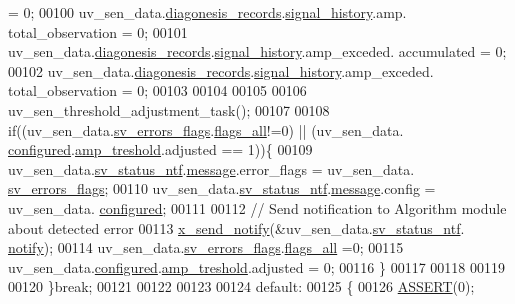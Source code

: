 \begin{DoxyCode}
                       = 0;
00100               uv\_sen\_data.\hyperlink{a00035_a7ae905b560513ad201e58c2f63375030}{diagonesis\_records}.\hyperlink{a00017_affb63906d23cb1cb7787d61eaaedfb60}{signal\_history}.amp.
      total\_observation           = 0;
00101               uv\_sen\_data.\hyperlink{a00035_a7ae905b560513ad201e58c2f63375030}{diagonesis\_records}.\hyperlink{a00017_affb63906d23cb1cb7787d61eaaedfb60}{signal\_history}.amp\_exceded.
      accumulated         = 0;
00102               uv\_sen\_data.\hyperlink{a00035_a7ae905b560513ad201e58c2f63375030}{diagonesis\_records}.\hyperlink{a00017_affb63906d23cb1cb7787d61eaaedfb60}{signal\_history}.amp\_exceded.
      total\_observation   = 0;
00103 
00104 
00105 
00106              uv\_sen\_threshold\_adjustment\_task();
00107 
00108             \textcolor{keywordflow}{if}((uv\_sen\_data.\hyperlink{a00035_aaeec6b0609dba31393f337abf1cce3d3}{sv\_errors\_flags}.\hyperlink{a00022_a1caa87b00c878186140c3bac9c8acf3b}{flags\_all}!=0)  || (uv\_sen\_data.
      \hyperlink{a00035_a94b2d1f6ea4ab334c74d24984dd27843}{configured}.\hyperlink{a00021_a4b3bbfb0267daea1432f2603825ade62}{amp\_treshold}.adjusted == 1))\{
00109              uv\_sen\_data.\hyperlink{a00035_afdc0e2c51e8e301d264700f4f9c10740}{sv\_status\_ntf}.\hyperlink{a00021_a13393a2d1589483b3bae4d2e79f43980}{message}.error\_flags = uv\_sen\_data.
      \hyperlink{a00035_aaeec6b0609dba31393f337abf1cce3d3}{sv\_errors\_flags};
00110              uv\_sen\_data.\hyperlink{a00035_afdc0e2c51e8e301d264700f4f9c10740}{sv\_status\_ntf}.\hyperlink{a00021_a13393a2d1589483b3bae4d2e79f43980}{message}.config = uv\_sen\_data.
      \hyperlink{a00035_a94b2d1f6ea4ab334c74d24984dd27843}{configured};
00111 
00112              \textcolor{comment}{// Send notification to Algorithm module about detected error}
00113              \hyperlink{a00036_ae17b0bb16da3c471bb6074bb4c4d0fee}{x\_send\_notify}(&uv\_sen\_data.\hyperlink{a00035_afdc0e2c51e8e301d264700f4f9c10740}{sv\_status\_ntf}.
      \hyperlink{a00021_a8e6a04c2283f9fd7b8dcbc62faba5847}{notify});
00114              uv\_sen\_data.\hyperlink{a00035_aaeec6b0609dba31393f337abf1cce3d3}{sv\_errors\_flags}.\hyperlink{a00022_a1caa87b00c878186140c3bac9c8acf3b}{flags\_all} =0;
00115              uv\_sen\_data.\hyperlink{a00035_a94b2d1f6ea4ab334c74d24984dd27843}{configured}.\hyperlink{a00021_a4b3bbfb0267daea1432f2603825ade62}{amp\_treshold}.adjusted = 0;
00116             \}
00117 
00118 
00119 
00120         \}\textcolor{keywordflow}{break};
00121 
00122 
00123 
00124         \textcolor{keywordflow}{default}:
00125         \{
00126             \hyperlink{a00072_abb8ff8e213ac9f6fb21d2b968583b936}{ASSERT}(0);

\end{DoxyCode}
